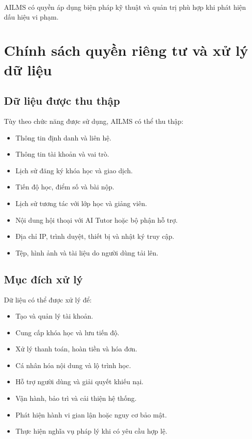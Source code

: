\documentclass[12pt,a4paper]{article}
\begin{document}
AILMS có quyền áp dụng biện pháp kỹ thuật và quản trị phù hợp khi phát hiện dấu hiệu vi phạm.

\section{Chính sách quyền riêng tư và xử lý dữ liệu}

\subsection{Dữ liệu được thu thập}

Tùy theo chức năng được sử dụng, AILMS có thể thu thập:

\begin{itemize}
    \item Thông tin định danh và liên hệ.
    \item Thông tin tài khoản và vai trò.
    \item Lịch sử đăng ký khóa học và giao dịch.
    \item Tiến độ học, điểm số và bài nộp.
    \item Lịch sử tương tác với lớp học và giảng viên.
    \item Nội dung hội thoại với AI Tutor hoặc bộ phận hỗ trợ.
    \item Địa chỉ IP, trình duyệt, thiết bị và nhật ký truy cập.
    \item Tệp, hình ảnh và tài liệu do người dùng tải lên.
\end{itemize}

\subsection{Mục đích xử lý}

Dữ liệu có thể được xử lý để:

\begin{itemize}
    \item Tạo và quản lý tài khoản.
    \item Cung cấp khóa học và lưu tiến độ.
    \item Xử lý thanh toán, hoàn tiền và hóa đơn.
    \item Cá nhân hóa nội dung và lộ trình học.
    \item Hỗ trợ người dùng và giải quyết khiếu nại.
    \item Vận hành, bảo trì và cải thiện hệ thống.
    \item Phát hiện hành vi gian lận hoặc nguy cơ bảo mật.
    \item Thực hiện nghĩa vụ pháp lý khi có yêu cầu hợp lệ.
\end{itemize}
\end{document}
